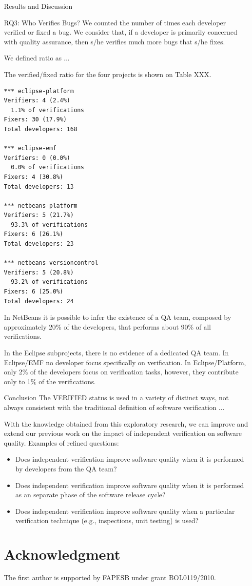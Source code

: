 \begin{section}{Results and Discussion}
\begin{subsection}{RQ3: Who Verifies Bugs?}
	We counted the number of times each developer verified or fixed a bug. We consider that, if a developer is primarily concerned with quality assurance, then s/he verifies much more bugs that s/he fixes.
	
	We defined ratio as ...
	
	The verified/fixed ratio for the four projects is shown on Table XXX.
	
\begin{verbatim}
*** eclipse-platform 
Verifiers: 4 (2.4%)
  1.1% of verifications
Fixers: 30 (17.9%)
Total developers: 168 

*** eclipse-emf 
Verifiers: 0 (0.0%)
  0.0% of verifications
Fixers: 4 (30.8%)
Total developers: 13 

*** netbeans-platform 
Verifiers: 5 (21.7%)
  93.3% of verifications
Fixers: 6 (26.1%)
Total developers: 23 

*** netbeans-versioncontrol 
Verifiers: 5 (20.8%)
  93.2% of verifications
Fixers: 6 (25.0%)
Total developers: 24 
\end{verbatim}
	
	In NetBeans it is possible to infer the existence of a QA team, composed by approximately 20\% of the developers, that performs about 90\% of all verifications.
	
	In the Eclipse subprojects, there is no evidence of a dedicated QA team. In Eclipse/EMF no developer focus specifically on verification. In Eclipse/Platform, only 2\% of the developers focus on verification tasks, however, they contribute only to 1\% of the verifications.
	
	
\end{subsection}

\end{section}

\begin{section}{Conclusion}
  The VERIFIED status is used in a variety of distinct ways, not always consistent with the traditional definition of software verification ...
	
	With the knowledge obtained from this exploratory research, we can improve and extend our previous work on the impact of independent verification on software quality. Examples of refined questions:
	
	\begin{itemize}
		\item Does independent verification improve software quality when it is performed by developers from the QA team?
		\item Does independent verification improve software quality when it is performed as an separate phase of the software release cycle?
		\item Does independent verification improve software quality when a particular verification technique (e.g., inspections, unit testing) is used?
	\end{itemize}
	
\end{section}

\section*{Acknowledgment}

The first author is supported by FAPESB under grant BOL0119/2010.
